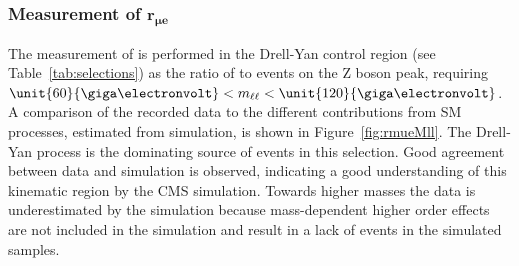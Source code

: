\subsubsection{Measurement of $\mathbf{r_{\mu e}}$}
The measurement of \rmue is performed in the Drell-Yan control region (see Table~\ref{tab:selections}) as the ratio of \MM to \EE events on the Z boson peak, requiring $\unit{60}{\giga\electronvolt} < \mll < \unit{120}{\giga\electronvolt}$. A comparison of the recorded data to the different contributions  from SM processes, estimated from simulation, is shown in Figure~\ref{fig:rmueMll}. The Drell-Yan process is the dominating source of events in this selection. Good agreement between data and simulation is observed, indicating a good understanding of this kinematic region by the CMS simulation. Towards higher masses the data is underestimated by the simulation because mass-dependent higher order effects are not included in the simulation and result in a lack of events in the simulated samples.  
